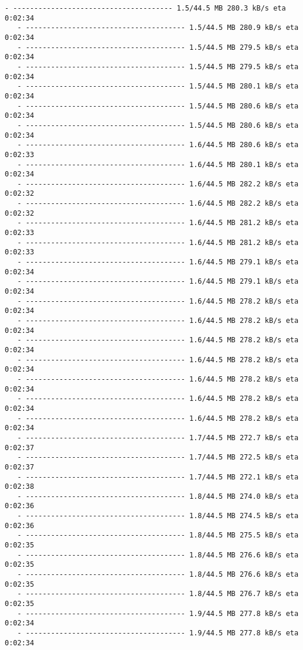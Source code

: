 \documentclass[11pt]{article}
\begin{document}
\begin{Verbatim}[commandchars=\\\{\}]
   - -------------------------------------- 1.5/44.5 MB 280.3 kB/s eta 0:02:34
   - -------------------------------------- 1.5/44.5 MB 280.9 kB/s eta 0:02:34
   - -------------------------------------- 1.5/44.5 MB 279.5 kB/s eta 0:02:34
   - -------------------------------------- 1.5/44.5 MB 279.5 kB/s eta 0:02:34
   - -------------------------------------- 1.5/44.5 MB 280.1 kB/s eta 0:02:34
   - -------------------------------------- 1.5/44.5 MB 280.6 kB/s eta 0:02:34
   - -------------------------------------- 1.5/44.5 MB 280.6 kB/s eta 0:02:34
   - -------------------------------------- 1.6/44.5 MB 280.6 kB/s eta 0:02:33
   - -------------------------------------- 1.6/44.5 MB 280.1 kB/s eta 0:02:34
   - -------------------------------------- 1.6/44.5 MB 282.2 kB/s eta 0:02:32
   - -------------------------------------- 1.6/44.5 MB 282.2 kB/s eta 0:02:32
   - -------------------------------------- 1.6/44.5 MB 281.2 kB/s eta 0:02:33
   - -------------------------------------- 1.6/44.5 MB 281.2 kB/s eta 0:02:33
   - -------------------------------------- 1.6/44.5 MB 279.1 kB/s eta 0:02:34
   - -------------------------------------- 1.6/44.5 MB 279.1 kB/s eta 0:02:34
   - -------------------------------------- 1.6/44.5 MB 278.2 kB/s eta 0:02:34
   - -------------------------------------- 1.6/44.5 MB 278.2 kB/s eta 0:02:34
   - -------------------------------------- 1.6/44.5 MB 278.2 kB/s eta 0:02:34
   - -------------------------------------- 1.6/44.5 MB 278.2 kB/s eta 0:02:34
   - -------------------------------------- 1.6/44.5 MB 278.2 kB/s eta 0:02:34
   - -------------------------------------- 1.6/44.5 MB 278.2 kB/s eta 0:02:34
   - -------------------------------------- 1.6/44.5 MB 278.2 kB/s eta 0:02:34
   - -------------------------------------- 1.7/44.5 MB 272.7 kB/s eta 0:02:37
   - -------------------------------------- 1.7/44.5 MB 272.5 kB/s eta 0:02:37
   - -------------------------------------- 1.7/44.5 MB 272.1 kB/s eta 0:02:38
   - -------------------------------------- 1.8/44.5 MB 274.0 kB/s eta 0:02:36
   - -------------------------------------- 1.8/44.5 MB 274.5 kB/s eta 0:02:36
   - -------------------------------------- 1.8/44.5 MB 275.5 kB/s eta 0:02:35
   - -------------------------------------- 1.8/44.5 MB 276.6 kB/s eta 0:02:35
   - -------------------------------------- 1.8/44.5 MB 276.6 kB/s eta 0:02:35
   - -------------------------------------- 1.8/44.5 MB 276.7 kB/s eta 0:02:35
   - -------------------------------------- 1.9/44.5 MB 277.8 kB/s eta 0:02:34
   - -------------------------------------- 1.9/44.5 MB 277.8 kB/s eta 0:02:34

\end{Verbatim}
\end{document}
